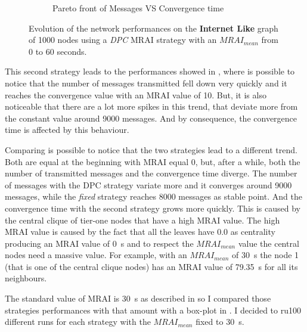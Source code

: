 \begin{figure}[h]
\begin{subfigure}[b]{0.49\textwidth}
		 \caption{Pareto front of Messages VS Convergence time}
         \label{fig:internt_like_1000_DPC_evolution_paretoFront}
     \end{subfigure}
		\caption{Evolution of the network performances on the \textbf{Internet Like} graph
			of \num{1000} nodes using a \textit{DPC} \ac{MRAI} strategy
			with an $MRAI_{mean}$ from \num{0} to \num{60} seconds.}
        \label{fig:internet_like_1000_dpc_evolution}
\end{figure}

This second strategy leads to the performances showed in ,
where is possible to notice that the number of messages transmitted fell down
very quickly and it reaches the convergence value with an \ac{MRAI} value of
\num{10}.
But, it is also noticeable that there are a lot more spikes in this trend, that
deviate more from the constant value around \num{9000} messages.
And by consequence, the convergence time is affected by this behaviour.

Comparing 
is possible to notice that the two strategies lead to a different trend.
Both are equal at the beginning with \ac{MRAI} equal \num{0}, but, after a while,
both the number of transmitted messages and the convergence time diverge.
The number of messages with the \ac{DPC} strategy variate more and it converges
around \num{9000} messages, while the \textit{fixed} strategy reaches \num{8000}
messages as stable point.
And the convergence time with the second strategy grows more quickly.
This is caused by the central clique of tier-one nodes that have a high \ac{MRAI}
value.
The high \ac{MRAI} value is caused by the fact that all the leaves have \num{0.0}
as centrality producing an \ac{MRAI} value of \SI{0}{\second} and to respect
the $MRAI_{mean}$ value the central nodes need a massive value.
For example, with an $MRAI_{mean}$ of \SI{30}{\second} the node \num{1} (that is
one of the central clique nodes) has an \ac{MRAI} value of \SI{79.35}{\second} for all its
neighbours.


The standard value of \ac{MRAI} is \SI{30}{\second} as described in
\cite{rfc4271} so I compared those strategies performances with that amount
with a box-plot in .
I decided to ru\num{100} different runs for each strategy with the $MRAI_{mean}$
fixed to \SI{30}{\second}.

